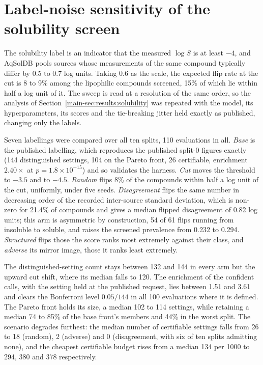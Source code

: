 \documentclass[10pt]{article}
\begin{document}
\section{Label-noise sensitivity of the solubility screen}
\label{sec:noise}

The solubility label is an indicator that the measured $\log S$ is at least $-4$, and AqSolDB
pools sources whose measurements of the same compound typically differ by 0.5 to 0.7 log
units. Taking 0.6 as the scale, the expected flip rate at the cut is 8 to 9\% among the
lipophilic compounds screened, 15\% of which lie within half a log unit of it. The sweep is
read at a resolution of the same order, so the analysis of
Section~\ref{main-sec:results:solubility} was repeated with the model, its hyperparameters,
its scores and the tie-breaking jitter held exactly as published, changing only the labels.

Seven labellings were compared over all ten splits, 110 evaluations in all. \emph{Base} is
the published labelling, which reproduces the published split-0 figures exactly (144
distinguished settings, 104 on the Pareto front, 26 certifiable, enrichment $2.40\times$ at
$p=1.8\times10^{-15}$) and so validates the harness. \emph{Cut} moves the threshold to
$-3.5$ and to $-4.5$. \emph{Random} flips 8\% of the compounds within half a log unit of the
cut, uniformly, under five seeds. \emph{Disagreement} flips the same number in decreasing
order of the recorded inter-source standard deviation, which is non-zero for 21.4\% of
compounds and gives a median flipped disagreement of 0.82 log units; this arm is asymmetric
by construction, 54 of 61 flips running from insoluble to soluble, and raises the screened
prevalence from 0.232 to 0.294. \emph{Structured} flips those the score ranks most extremely
against their class, and \emph{adverse} its mirror image, those it ranks least extremely.

The distinguished-setting count stays between 132 and 144 in every arm but the upward cut
shift, where its median falls to 120. The enrichment of the confident calls, with the setting
held at the published request, lies between 1.51 and 3.61 and clears the Bonferroni level
$0.05/144$ in all 100 evaluations where it is defined. The Pareto front holds its size, a
median 102 to 114 settings, while retaining a median 74 to 85\% of the base front's members
and 44\% in the worst split. The scenario degrades furthest: the median number of certifiable
settings falls from 26 to 18 (random), 2 (adverse) and 0 (disagreement, with six of ten
splits admitting none), and the cheapest certifiable budget rises from a median 134 per 1000
to 294, 380 and 378 respectively.
\end{document}
